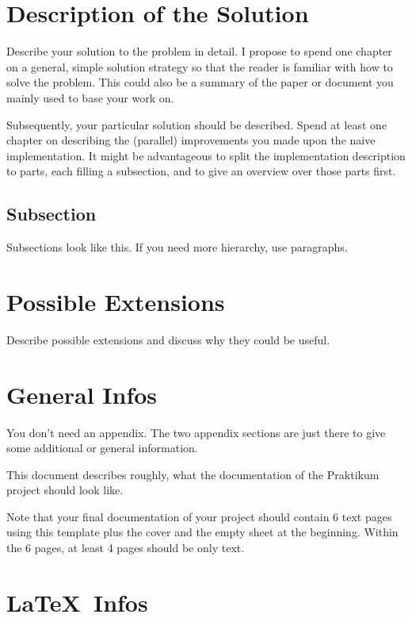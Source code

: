\documentclass{utue} %
\begin{document}
\section{Description of the Solution}

Describe your solution to the problem in detail. I propose to spend one chapter on a general, simple solution strategy so that the reader is familiar with how to solve the problem. This could also be a summary of the paper or document you mainly used to base your work on.

Subsequently, your particular solution should be described. Spend at least one chapter on describing the (parallel) improvements you made upon the naive implementation. It might be advantageous to split the implementation description to parts, each filling a subsection, and to give an overview over those parts first.

\subsection{Subsection}

Subsections look like this. If you need more hierarchy, use paragraphs.

\section{Possible Extensions}

Describe possible extensions and discuss why they could be useful.


\appendix

\section{General Infos}

You don't need an appendix. The two appendix sections are just there to give some additional or general information.

This document describes roughly, what the documentation of the Praktikum project should look like.

Note that your final documentation of your project should contain 6 text pages using this template plus the cover and the empty sheet at the beginning. Within the 6 pages, at least 4 pages should be only text.

\section{\LaTeX~Infos}
\end{document}
